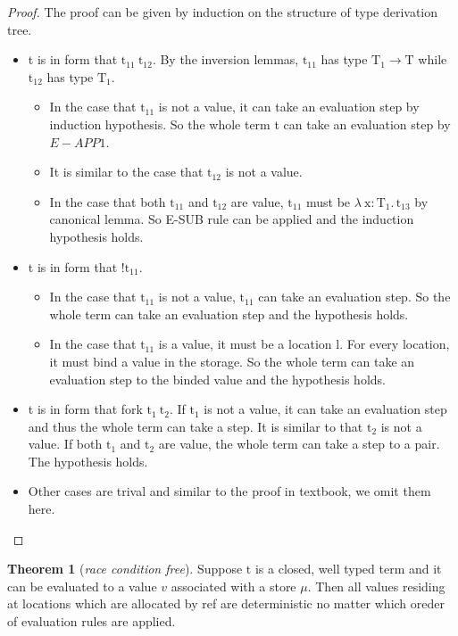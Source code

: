 \documentclass[10pt]{article}
\theoremstyle{definition}\newtheorem*{theorem}{Theorem}
\theoremstyle{definition}\newtheorem*{definition}{Definition}
\begin{document}
    \begin{proof}
        The proof can be given by induction on the structure of type derivation tree.
        \begin{itemize}
            \item t is in form that $\mathrm{t_{11}}\ \mathrm{t_{12}}$. By the inversion lemmas, $\mathrm{t_{11}}$ has type $\mathrm{T_1}\to\mathrm{T}$ while $\mathrm{t_{12}}$ has type $\mathrm{T_1}$.
                \begin{itemize}
                    \item In the case that $\mathrm{t_{11}}$ is not a value, it can take an evaluation step by induction hypothesis. So the whole term t can take an evaluation step by $E-APP1$.
                    \item It is similar to the case that $\mathrm{t_{12}}$ is not a value. 
                    \item In the case that both $\mathrm{t_{11}}$ and $\mathrm{t_{12}}$ are value, $\mathrm{t_{11}}$ must be $\lambda\ \mathrm{x}\colon\mathrm{T_1}.\,\mathrm{t_{13}}$ by canonical lemma.
                            So E-SUB rule can be applied and the induction hypothesis holds.
                \end{itemize}
            \item t is in form that $!\mathrm{t_{11}}$. 
                \begin{itemize}
                    \item In the case that $\mathrm{t_{11}}$ is not a value, $\mathrm{t_{11}}$ can take an evaluation step. So the whole term can take an evaluation step and the hypothesis holds.
                    \item In the case that $\mathrm{t_{11}}$ is a value, it must be a location $\mathrm{l}$. For every location, it must bind a value in the storage. So the whole term can take an evaluation step to the binded value and the hypothesis holds.
                \end{itemize}
            \item t is in form that fork $\mathrm{t_1}\ \mathrm{t_2}$. If $\mathrm{t_1}$ is not a value, it can take an evaluation step and thus the whole term can take a step.
                It is similar to that $\mathrm{t_2}$ is not a value. If both $\mathrm{t_1}$ and $\mathrm{t_2}$ are value, the whole term can take a step to a pair. The hypothesis holds.
            \item Other cases are trival and similar to the proof in textbook, we omit them here.
        \end{itemize}
    \end{proof}
    \begin{theorem}[{\it race condition free}]
        Suppose $\mathrm{t}$ is a closed, well typed term and it can be evaluated to a value $v$ associated with a store $\mu$. Then all values residing at locations which are allocated by ref are deterministic no matter which oreder of evaluation rules are applied.
    \end{theorem}
\end{document}

